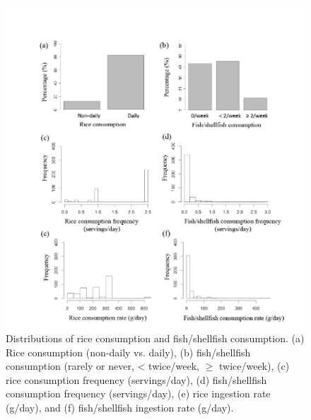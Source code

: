 \begin{figure}
  \centering
    \label{fig:Fig26}
  \includegraphics[scale=1]{Figures/Fig26.pdf}
  \caption[Distributions of rice consumption and fish/shellfish consumption]{Distributions of rice consumption and fish/shellfish consumption. (a) Rice consumption (non-daily vs. daily), (b) fish/shellfish consumption (rarely or never, < twice/week, ${\ge}$ twice/week), (c) rice consumption frequency (servings/day), (d) fish/shellfish consumption frequency (servings/day), (e) rice ingestion rate (g/day), and (f) fish/shellfish ingestion rate (g/day).}
\end{figure}

